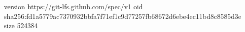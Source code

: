 version https://git-lfs.github.com/spec/v1
oid sha256:fd1a5779ac7370932bbfa7f71ef1c9d77257fb68672d6ebe4ec11bd8c8585d3e
size 524384

